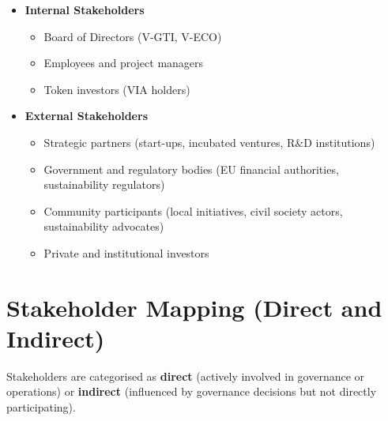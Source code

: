 \documentclass[
  english,
  12pt,
  oneside,
  open=any]{scrbook}
\providecommand{\tightlist}{%
  \setlength{\itemsep}{0pt}\setlength{\parskip}{0pt}}\usepackage{longtable,booktabs,array}
\begin{document}
\begin{itemize}
\tightlist
\item
  \textbf{Internal Stakeholders}

  \begin{itemize}
  \tightlist
  \item
    Board of Directors (V-GTI, V-ECO)\\
  \item
    Employees and project managers\\
  \item
    Token investors (VIA holders)
  \end{itemize}
\item
  \textbf{External Stakeholders}

  \begin{itemize}
  \tightlist
  \item
    Strategic partners (start-ups, incubated ventures, R\&D
    institutions)\\
  \item
    Government and regulatory bodies (EU financial authorities,
    sustainability regulators)\\
  \item
    Community participants (local initiatives, civil society actors,
    sustainability advocates)\\
  \item
    Private and institutional investors
  \end{itemize}
\end{itemize}

\section{Stakeholder Mapping (Direct and Indirect)}\label{sec-map}

Stakeholders are categorised as \textbf{direct} (actively involved in
governance or operations) or \textbf{indirect} (influenced by governance
decisions but not directly participating).
\end{document}
